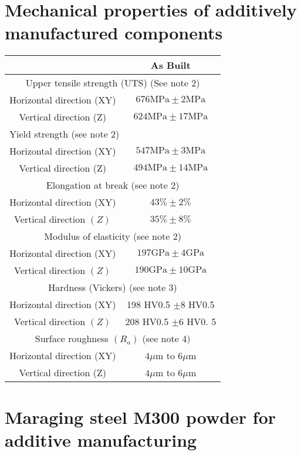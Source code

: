 \documentclass[10pt]{article}
\begin{document}
\section*{Mechanical properties of additively manufactured components}
\begin{center}
\begin{tabular}{|c|c|}
\hline
 & As Built \\
\hline
\multicolumn{2}{|c|}{Upper tensile strength (UTS) (See note 2)} \\
\hline
Horizontal direction (XY) & $676 \mathrm{MPa} \pm 2 \mathrm{MPa}$ \\
\hline
Vertical direction (Z) & $624 \mathrm{MPa} \pm 17 \mathrm{MPa}$ \\
\hline
\multicolumn{2}{|l|}{Yield strength (see note 2)} \\
\hline
Horizontal direction (XY) & $547 \mathrm{MPa} \pm 3 \mathrm{MPa}$ \\
\hline
Vertical direction (Z) & $494 \mathrm{MPa} \pm 14 \mathrm{MPa}$ \\
\hline
\multicolumn{2}{|c|}{Elongation at break (see note 2)} \\
\hline
Horizontal direction (XY) & $43 \% \pm 2 \%$ \\
\hline
Vertical direction $(Z)$ & $35 \% \pm 8 \%$ \\
\hline
\multicolumn{2}{|c|}{Modulus of elasticity (see note 2)} \\
\hline
Horizontal direction (XY) & $197 \mathrm{GPa} \pm 4 \mathrm{GPa}$ \\
\hline
Vertical direction $(Z)$ & $190 \mathrm{GPa} \pm 10 \mathrm{GPa}$ \\
\hline
\multicolumn{2}{|c|}{Hardness (Vickers) (see note 3)} \\
\hline
Horizontal direction (XY) & 198 HV0.5 $\pm 8$ HV0.5 \\
\hline
Vertical direction $(Z)$ & 208 HV0.5 $\pm 6$ HV0. 5 \\
\hline
\multicolumn{2}{|c|}{Surface roughness $\left(R_{a}\right)$ (see note 4$)$} \\
\hline
Horizontal direction (XY) & $4 \mu \mathrm{m}$ to $6 \mu \mathrm{m}$ \\
\hline
Vertical direction (Z) & $4 \mu \mathrm{m}$ to $6 \mu \mathrm{m}$ \\
\hline
\end{tabular}
\end{center}

\section*{Maraging steel M300 powder for additive manufacturing}
\end{document}
